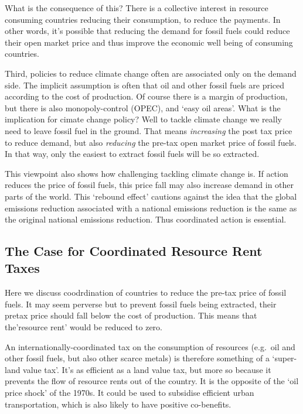 \documentclass[]{tufte-handout}
\begin{document}
What is the consequence of this? There is a collective interest in
resource consuming countries reducing their consumption, to reduce the
payments. In other words, it's possible that reducing the demand for
fossil fuels could reduce their open market price and thus improve the
economic well being of consuming countries.

Third, policies to reduce climate change often are associated only on
the demand side. The implicit assumption is often that oil and other
fossil fuels are priced according to the cost of production. Of course
there is a margin of production, but there is also monopoly-control
(OPEC), and `easy oil areas'. What is the implication for cimate change
policy? Well to tackle climate change we really need to leave fossil
fuel in the ground. That means \emph{increasing} the post tax price to
reduce demand, but also \emph{reducing} the pre-tax open market price of
fossil fuels. In that way, only the easiest to extract fossil fuels will
be so extracted.

This viewpoint also shows how challenging tackling climate change is. If
action reduces the price of fossil fuels, this price fall may also
increase demand in other parts of the world. This `rebound effect'
cautions against the idea that the global emissions reduction associated
with a national emissions reduction is the same as the original national
emissions reduction. Thus coordinated action is essential.

\hypertarget{the-case-for-coordinated-resource-rent-taxes}{%
\subsection{The Case for Coordinated Resource Rent
Taxes}\label{the-case-for-coordinated-resource-rent-taxes}}

Here we discuss coodrdination of countries to reduce the pre-tax price
of fossil fuels. It may seem perverse but to prevent fossil fuels being
extracted, their pretax price should fall below the cost of production.
This means that the'resource rent' would be reduced to zero.

An internationally-coordinated tax on the consumption of resources
(e.g.~oil and other fossil fuels, but also other scarce metals) is
therefore something of a `super-land value tax'. It's as efficient as a
land value tax, but more so because it prevents the flow of resource
rents out of the country. It is the opposite of the `oil price shock' of
the 1970s. It could be used to subsidise efficient urban transportation,
which is also likely to have positive co-benefits.
\end{document}
